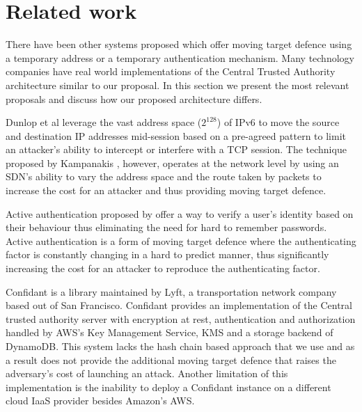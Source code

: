 \documentclass[a4paper,twoside]{article}
\begin{document}

\section{Related work}

There have been other systems proposed which offer moving target defence using a temporary address or a temporary authentication mechanism. Many technology companies have real world implementations of the Central Trusted Authority architecture similar to our proposal. In this section we present the most relevant proposals and discuss how our proposed architecture differs. 

Dunlop et al \cite{dunlop_mt6d:_2011} leverage the vast address space ($2^{128}$) of IPv6 to move the source and destination IP addresses mid-session based on a pre-agreed pattern to limit an attacker's ability to intercept or interfere with a TCP session. The technique proposed by Kampanakis \cite{kampanakis_sdn-based_2014}, however, operates at the network level by using an SDN's ability to vary the address space and the route taken by packets to increase the cost for an attacker and thus providing moving target defence.

Active authentication proposed by \cite{yiu_authentication_2011,aksari_active_2009,li_active_2014} offer a way to verify a user's identity based on their behaviour thus eliminating the need for hard to remember passwords. Active authentication is a form of moving target defence where the authenticating factor is constantly changing in a hard to predict manner, thus significantly increasing the cost for an attacker to reproduce the authenticating factor.

Confidant \cite{lyft_confidant:_2015} is a library maintained by Lyft, a transportation network company based out of San Francisco. Confidant provides an implementation of the Central trusted authority server with encryption at rest, authentication and authorization handled by AWS's Key Management Service, KMS and a storage backend of DynamoDB.  This system lacks the hash chain based approach that we use and as a result does not provide the additional moving target defence that raises the adversary's cost of launching an attack. Another limitation of this implementation is the inability to deploy a Confidant instance on a different cloud IaaS provider besides Amazon's AWS. 
\end{document}
